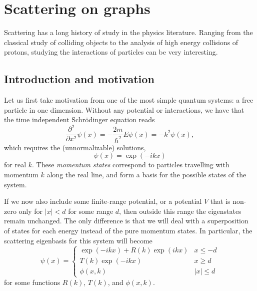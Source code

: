 % 

\chapter{Scattering on graphs}

Scattering has a long history of study in the physics literature.  Ranging from the classical study of colliding objects to the analysis of high energy collisions of protons, studying the interactions of particles can be very interesting.


\section{Introduction and motivation}


Let us first take motivation from one of the most simple quantum systems: a free particle in one dimension.  Without any potential or interactions, we have that the time independent Schr\"{o}dinger equation reads
\[
  \frac{\partial^2}{\partial x^2} \psi(x) = -\frac{2m}{\hbar^2}E \psi(x) = -k^2 \psi(x),
\]
which requires the (unnormalizable) solutions,
\[
  \psi(x) = \exp(- i k x) 
\]
for real $k$.  These \textit{momentum states} correspond to particles travelling with momentum $k$ along the real line, and form a basis for the possible states of the system.


If we now also include some finite-range potential, or a potential $V$ that is non-zero only for $|x| < d$ for some range $d$, then outside this range the eigenstates remain unchanged.  The only difference is that we will deal with a superposition of states for each energy instead of the pure momentum states.  In particular, the scattering eigenbasis for this system will become
\[
  \psi(x) = \begin{cases}
    \exp(-i k x) + R(k) \exp(i k x) & x \leq -d\\
    T(k) \exp(- i k x) & x \geq d\\
    \phi(x,k) & |x| \leq d
    \end{cases}
\]
for some functions $R(k)$, $T(k)$, and $\phi(x,k)$.  


